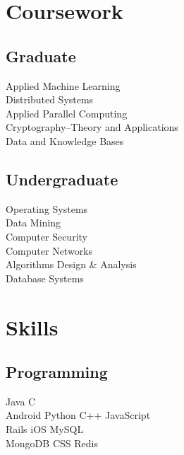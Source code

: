 \documentclass[]{deedy-resume-openfont}
\begin{document}
\begin{minipage}[t]{0.30\textwidth}

\section{Coursework}
\subsection{Graduate}
Applied Machine Learning \\
Distributed Systems \\
Applied Parallel Computing \\
Cryptography–Theory and Applications \\
Data and Knowledge Bases \\
\sectionsep

\subsection{Undergraduate}
Operating Systems \\
Data Mining \\
Computer Security\\
Computer Networks\\
Algorithms Design \& Analysis\\
Database Systems\\
\sectionsep


\section{Skills}
\subsection{Programming}
\textbullet{} Java     \textbullet{} C \\

\textbullet{} Android
\textbullet{} Python \textbullet{} C++ \textbullet{} JavaScript \\
\textbullet{}Rails \textbullet{} iOS  \textbullet{} MySQL \\ \textbullet{} MongoDB\textbullet{} CSS \textbullet{}Redis
\sectionsep

%
%

\end{minipage} 
\end{document}
